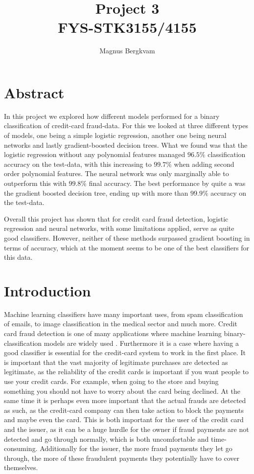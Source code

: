 \documentclass{article}
\title{Project 3 \\ FYS-STK3155/4155}
\author{Magnus Bergkvam}
\begin{document}
\maketitle

\tableofcontents
\newpage


\section{Abstract}
In this project we explored how different models performed for a binary
classification of credit-card fraud-data. For this we looked at three different
types of models, one being a simple logistic regression, another one being
neural networks and lastly gradient-boosted decision trees.  What we found was
that the logistic regression without any polynomial features managed $96.5\%$
classification accuracy on the test-data, with this increasing to $99.7\%$ when
adding second order polynomial features. The neural network was only marginally
able to outperform this with $99.8\%$ final accuracy.  The best performance by
quite a was the gradient boosted decision tree, ending up with more than
$99.9\%$ accuracy on the test-data.

Overall this project has shown that for credit card fraud detection,
logistic regression and neural networks, with some limitations applied, serve as
quite good classifiers. However, neither of these methods surpassed gradient
boosting in terms of accuracy, which at the moment seems to be one of the best
classifiers for this data.

\section{Introduction}
Machine learning classifiers have many important uses, from spam classification
of emails, to image classification in the medical sector and much more.
Credit card fraud detection is one of many applications where machine learning
binary-classification models are widely used \cite{creditcardfraud}. Furthermore
it is a case where having a good classifier is essential for the credit-card
system to work in the first place. It is important that the vast majority of
legitimate purchases are detected as legitimate, as the reliability of the credit
cards is important if you want people to use your credit cards. For example,
when going to the store and buying something you should not have to worry
about the card being declined. At the same time it is perhaps even more
important that the actual frauds are detected as such, as the credit-card
company can then take action to block the payments and maybe even the card. This
is both important for the user of the credit card and the issuer, as it can be a
huge hurdle for the owner if fraud payments are not detected and go through
normally, which is both uncomfortable and time-consuming. Additionally for the
issuer, the more fraud payments they let go through, the more of these
fraudulent payments they potentially have to cover themselves.
\\
\end{document}
